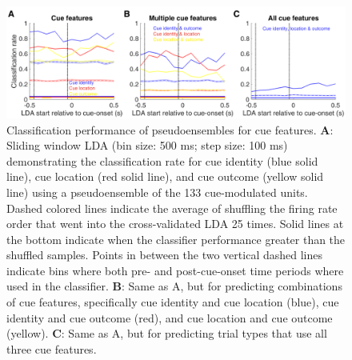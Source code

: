 \documentclass[11pt]{article}
\newcommand{\bsf}[1]{\textbf{#1}}
\begin{document}
 \begin{figure}[ht!]
\centering
\includegraphics[width=\textwidth]{Fig 6 - LDA.pdf}
\caption{Classification performance of pseudoensembles for cue features. \bsf{A}: Sliding window LDA (bin size: 500 ms; step size: 100 ms) demonstrating the classification rate for cue identity (blue solid line), cue location (red solid line), and cue outcome (yellow solid line) using a pseudoensemble of the 133 cue-modulated units. Dashed colored lines indicate the average of shuffling the firing rate order that went into the cross-validated LDA 25 times. Solid lines at the bottom indicate when the classifier performance greater than the shuffled samples. Points in between the two vertical dashed lines indicate bins where both pre- and post-cue-onset time periods where used in the classifier. \bsf{B}: Same as A, but for predicting combinations of cue features, specifically cue identity and cue location (blue), cue identity and cue outcome (red), and cue location and cue outcome (yellow). \bsf{C}: Same as A, but for predicting trial types that use all three cue features.}
\label{fig:LDA}
\end{figure} \clearpage
\end{document}
